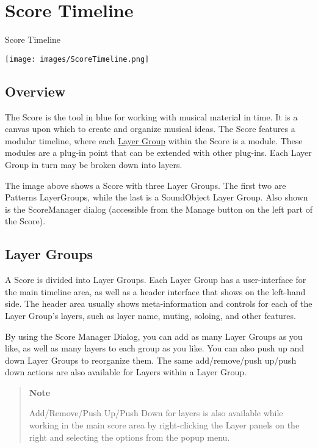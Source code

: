 \section{Score Timeline}\label{scoreTimeline}

Score Timeline

\texttt{[image: images/ScoreTimeline.png]}

\subsection{Overview}

The Score is the tool in blue for working with musical material in time.
It is a canvas upon which to create and organize musical ideas. The
Score features a modular timeline, where each
\protect\hyperlink{layerGroups}{Layer Group} within the Score is a
module. These modules are a plug-in point that can be extended with
other plug-ins. Each Layer Group in turn may be broken down into layers.

The image above shows a Score with three Layer Groups. The first two are
Patterns LayerGroups, while the last is a SoundObject Layer Group. Also
shown is the ScoreManager dialog (accessible from the Manage button on
the left part of the Score).

\hypertarget{layerGroups}{\subsection{Layer Groups}\label{layerGroups}}

A Score is divided into Layer Groups. Each Layer Group has a
user-interface for the main timeline area, as well as a header interface
that shows on the left-hand side. The header area usually shows
meta-information and controls for each of the Layer Group's layers, such
as layer name, muting, soloing, and other features.

By using the Score Manager Dialog, you can add as many Layer Groups as
you like, as well as many layers to each group as you like. You can also
push up and down Layer Groups to reorganize them. The same
add/remove/push up/push down actions are also available for Layers
within a Layer Group.

\begin{quote}
\textbf{Note}

Add/Remove/Push Up/Push Down for layers is also available while working
in the main score area by right-clicking the Layer panels on the right
and selecting the options from the popup menu.
\end{quote}


